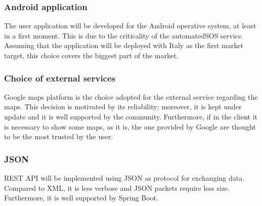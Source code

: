 \subsubsection{Android application} 	 
The user application will be developed for the Android operative system, at least in a first moment. This is due to the criticality of the
automatedSOS service. Assuming that the application will be deployed with Italy as the first market target, this choice covers the biggest
part of the market.

\subsubsection{Choice of external services}
Google maps platform is the choice adopted for the external service regarding the maps. This decision is motivated by its reliability;
moreover, it is kept under update and it is well supported by the community. Furthermore, if in the client it is necessary to show some maps,
as it is, the one provided by Google are thought to be the most trusted by the user. 


\subsubsection{JSON}
REST API will be implemented using JSON as protocol for exchanging data. \\
Compared to XML, it is less verbose and JSON packets require less size. Furthermore, it is well supported
by Spring Boot. 
